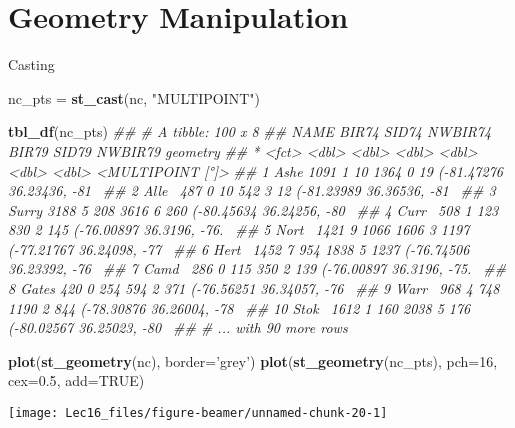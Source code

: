 \documentclass[11pt,ignorenonframetext,]{beamer}
\newenvironment{Shaded}{}{}
\newcommand{\CommentTok}[1]{\textcolor[rgb]{0.38,0.63,0.69}{\textit{#1}}}
\newcommand{\DataTypeTok}[1]{\textcolor[rgb]{0.56,0.13,0.00}{#1}}
\newcommand{\DecValTok}[1]{\textcolor[rgb]{0.25,0.63,0.44}{#1}}
\newcommand{\FloatTok}[1]{\textcolor[rgb]{0.25,0.63,0.44}{#1}}
\newcommand{\KeywordTok}[1]{\textcolor[rgb]{0.00,0.44,0.13}{\textbf{#1}}}
\newcommand{\NormalTok}[1]{#1}
\newcommand{\OtherTok}[1]{\textcolor[rgb]{0.00,0.44,0.13}{#1}}
\newcommand{\StringTok}[1]{\textcolor[rgb]{0.25,0.44,0.63}{#1}}
\let\oldShaded\Shaded
\let\endoldShaded\endShaded
\renewenvironment{Shaded}{\footnotesize\begin{spacing}{0.9}\oldShaded}{\endoldShaded\end{spacing}}
\let\oldverbatim\verbatim
\let\endoldverbatim\endverbatim
\newcommand{\scriptoutput}{
  \renewenvironment{Shaded}{\scriptsize\begin{spacing}{0.9}\oldShaded}{\endoldShaded\end{spacing}}
  \renewenvironment{verbatim}{\scriptsize\begin{spacing}{0.9}\oldverbatim}{\endoldverbatim\end{spacing}}
}
\begin{document}
\hypertarget{geometry-manipulation}{%
\section{Geometry Manipulation}\label{geometry-manipulation}}

\begin{frame}[fragile,t]{Casting}
\protect\hypertarget{casting}{}

\scriptoutput

\begin{Shaded}
\begin{Highlighting}[]
\NormalTok{nc_pts =}\StringTok{ }\KeywordTok{st_cast}\NormalTok{(nc, }\StringTok{"MULTIPOINT"}\NormalTok{)}

\KeywordTok{tbl_df}\NormalTok{(nc_pts)}
\CommentTok{## # A tibble: 100 x 8}
\CommentTok{##    NAME  BIR74 SID74 NWBIR74 BIR79 SID79 NWBIR79                  geometry}
\CommentTok{##  * <fct> <dbl> <dbl>   <dbl> <dbl> <dbl>   <dbl>          <MULTIPOINT [°]>}
\CommentTok{##  1 Ashe   1091     1      10  1364     0      19 (-81.47276 36.23436, -81~}
\CommentTok{##  2 Alle~   487     0      10   542     3      12 (-81.23989 36.36536, -81~}
\CommentTok{##  3 Surry  3188     5     208  3616     6     260 (-80.45634 36.24256, -80~}
\CommentTok{##  4 Curr~   508     1     123   830     2     145 (-76.00897 36.3196, -76.~}
\CommentTok{##  5 Nort~  1421     9    1066  1606     3    1197 (-77.21767 36.24098, -77~}
\CommentTok{##  6 Hert~  1452     7     954  1838     5    1237 (-76.74506 36.23392, -76~}
\CommentTok{##  7 Camd~   286     0     115   350     2     139 (-76.00897 36.3196, -75.~}
\CommentTok{##  8 Gates   420     0     254   594     2     371 (-76.56251 36.34057, -76~}
\CommentTok{##  9 Warr~   968     4     748  1190     2     844 (-78.30876 36.26004, -78~}
\CommentTok{## 10 Stok~  1612     1     160  2038     5     176 (-80.02567 36.25023, -80~}
\CommentTok{## # ... with 90 more rows}
\end{Highlighting}
\end{Shaded}

\end{frame}

\begin{frame}[fragile,t]{}
\protect\hypertarget{section}{}

\scriptoutput

\begin{Shaded}
\begin{Highlighting}[]
\KeywordTok{plot}\NormalTok{(}\KeywordTok{st_geometry}\NormalTok{(nc), }\DataTypeTok{border=}\StringTok{'grey'}\NormalTok{)}
\KeywordTok{plot}\NormalTok{(}\KeywordTok{st_geometry}\NormalTok{(nc_pts), }\DataTypeTok{pch=}\DecValTok{16}\NormalTok{, }\DataTypeTok{cex=}\FloatTok{0.5}\NormalTok{, }\DataTypeTok{add=}\OtherTok{TRUE}\NormalTok{)}
\end{Highlighting}
\end{Shaded}

\begin{center}\texttt{[image: Lec16\_files/figure-beamer/unnamed-chunk-20-1]} \end{center}

\end{frame}
\end{document}
